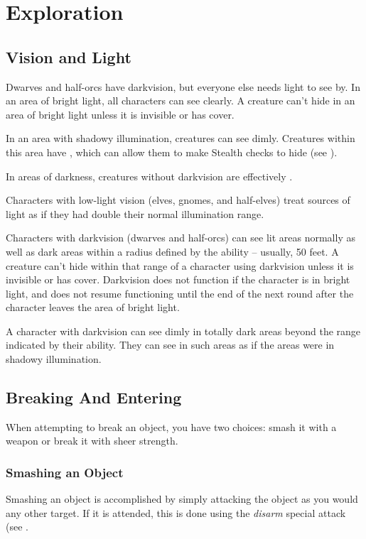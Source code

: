 \section{Exploration}
\subsection{Vision and Light}
Dwarves and half-orcs have darkvision, but everyone else needs light to see by.  In an area of bright light, all characters can see clearly. A creature can't hide in an area of bright light unless it is invisible or has cover.

In an area with shadowy illumination, creatures can see dimly.
Creatures within this area have \concealment, which can allow them to make Stealth checks to hide (see ).

In areas of darkness, creatures without darkvision are effectively \blinded.

Characters with low-light vision (elves, gnomes, and half-elves) treat sources of light as if they had double their normal illumination range.

Characters with darkvision (dwarves and half-orcs) can see lit areas normally as well as dark areas within a radius defined by the ability -- usually, 50 feet. A creature can't hide within that range of a character using darkvision unless it is invisible or has cover. Darkvision does not function if the character is in bright light, and does not resume functioning until the end of the next round after the character leaves the area of bright light.

A character with darkvision can see dimly in totally dark areas beyond the range indicated by their ability. They can see in such areas as if the areas were in shadowy illumination.

\subsection{Breaking And Entering}
When attempting to break an object, you have two choices: smash it with a weapon or break it with sheer strength.

\subsubsection{Smashing an Object}
    Smashing an object is accomplished by simply attacking the object as you would any other target. If it is attended, this is done using the \textit{disarm} special attack (see .

